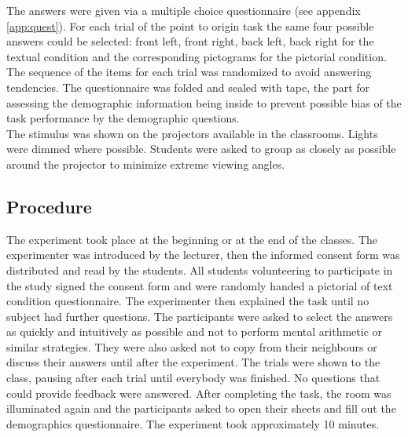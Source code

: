 \documentclass{frontiersSCNS} %
\begin{document}
The answers were given via a multiple choice questionnaire (see appendix \ref{app:quest}). For each trial of the point to origin task the same four possible answers could be selected: front left, front right, back left, back right for the textual condition and the corresponding pictograms for the pictorial condition. The sequence of the items for each trial was randomized to avoid answering tendencies. The questionnaire was folded and sealed with tape, the part for assessing the demographic information being inside to prevent possible bias of the task performance by the demographic questions. \\
The stimulus was shown on the projectors available in the classrooms. Lights were dimmed where possible. Students were asked to group as closely as possible around the projector to minimize extreme viewing angles.

\subsection{Procedure}
The experiment took place at the beginning or at the end of the classes. The experimenter was introduced by the lecturer, then the informed consent form was distributed and read by the students. All students volunteering to participate in the study signed the consent form and were randomly handed a pictorial of text condition questionnaire. The experimenter then explained the task until no subject had further questions. The participants were asked to select the answers as quickly and intuitively as possible and not to perform mental arithmetic or similar strategies. They were also asked not to copy from their neighbours or discuss their answers until after the experiment.
The trials were shown to the class, pausing after each trial until everybody was finished. No questions that could provide feedback were answered.
After completing the task, the room was illuminated again and the participants asked to open their sheets and fill out the demographics questionnaire. The experiment took approximately 10 minutes.
\end{document}
